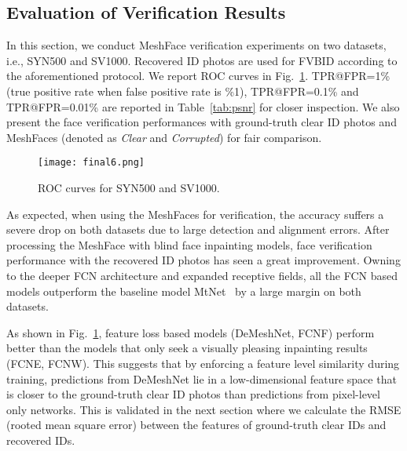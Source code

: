 \documentclass[10pt,twocolumn,letterpaper]{article}
\begin{document}
\subsection{Evaluation of Verification Results}

In this section, we conduct MeshFace verification experiments on two datasets, i.e., SYN500 and SV1000. Recovered ID photos are used for FVBID according to the aforementioned protocol.
We report ROC curves in Fig.~\ref{fig:roc}. TPR@FPR=1\% (true positive rate when false positive rate is \%1), TPR@FPR=0.1\% and TPR@FPR=0.01\% are reported in Table~\ref{tab:psnr} for closer inspection. We also present the face verification performances with ground-truth clear ID photos and MeshFaces (denoted as \textit{Clear} and \textit{Corrupted}) for fair comparison.
\begin{figure}
  \centering
    \texttt{[image: final6.png]}
    \caption{ROC curves for SYN500 and SV1000.}
    \label{fig:roc} %
\end{figure}


As expected, when using the MeshFaces for verification, the accuracy suffers a severe drop on both datasets due to large detection and alignment errors. After processing the MeshFace with blind face inpainting models, face verification performance with the recovered ID photos has seen a great improvement. Owning to the deeper FCN architecture and expanded receptive fields, all the FCN based models outperform the baseline model MtNet~\cite{7550058} by a large margin on both datasets.

As shown in Fig.~\ref{fig:roc}, feature loss based models (DeMeshNet, FCNF) perform better than the models that only seek a visually pleasing inpainting results (FCNE, FCNW). This suggests that by enforcing a feature level similarity during training, predictions from DeMeshNet lie in a low-dimensional feature space that is closer to the ground-truth clear ID photos than predictions from pixel-level only networks. This is validated in the next section where we calculate the RMSE (rooted mean square error) between the features of ground-truth clear IDs and recovered IDs.


\end{document}
